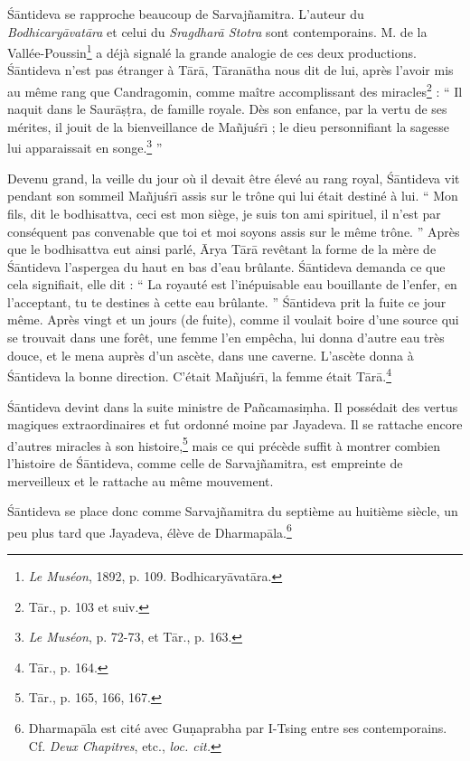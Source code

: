 \documentclass[a4paper, 11pt, oneside, french]{article}
\begin{document}
\'{S}\={a}ntideva se rapproche beaucoup de Sarvaj\~{n}amitra. L'auteur du \emph{Bodhicary\={a}vat\={a}ra} et celui du \emph{Sragdhar\={a} Stotra} sont contemporains. M. de la Vallée-Poussin\footnote{\emph{Le Muséon}, 1892, p. 109. Bodhicary\={a}vat\={a}ra.} a déjà signalé la grande analogie de ces deux productions. \'{S}\={a}ntideva n'est pas étranger à T\={a}r\={a}, T\={a}ran\={a}tha nous dit de lui, après l'avoir mis au même rang que Candragomin, comme maître accomplissant des miracles\footnote{T\={a}r., p. 103 et suiv.} : `` Il naquit dans le Saur\={a}\d{s}\d{t}ra, de famille royale. Dès son enfance, par la vertu de ses mérites, il jouit de la bienveillance de Ma\~{n}ju\'{s}r\={\i} ; le dieu personnifiant la sagesse lui apparaissait en songe.\footnote{\emph{Le Muséon}, p. 72-73, et T\={a}r., p. 163.} ''

Devenu grand, la veille du jour où il devait être élevé au rang royal, \'{S}\={a}ntideva vit pendant son sommeil Ma\~{n}ju\'{s}r\={\i} assis sur le trône qui lui était destiné à lui. `` Mon fils, dit le bodhisattva, ceci est mon siège, je suis ton ami spirituel, il n'est par conséquent pas convenable que toi et moi soyons assis sur le même trône. '' Après que le bodhisattva eut ainsi parlé, \={A}rya T\={a}r\={a} revêtant la forme de la mère de \'{S}\={a}ntideva l'aspergea du haut en bas d'eau brûlante. \'{S}\={a}ntideva demanda ce que cela signifiait, elle dit : `` La royauté est l'inépuisable eau bouillante de l'enfer, en l'acceptant, tu te destines à cette eau brûlante. '' \'{S}\={a}ntideva prit la fuite ce jour même. Après vingt et un jours (de fuite), comme il voulait boire d'une source qui se trouvait dans une forêt, une femme l'en empêcha, lui donna d'autre eau très douce, et le mena auprès d'un ascète, dans une caverne. L'ascète donna à \'{S}\={a}ntideva la bonne direction. C'était Ma\~{n}ju\'{s}r\={\i}, la femme était T\={a}r\={a}.\footnote{T\={a}r., p. 164.}

\'{S}\={a}ntideva devint dans la suite ministre de Pa\~{n}camasi\d{m}ha. Il possédait des vertus magiques extraordinaires et fut ordonné moine par Jayadeva. Il se rattache encore d'autres miracles à son histoire,\footnote{T\={a}r., p. 165, 166, 167.} mais ce qui précède suffit à montrer combien l'histoire de \'{S}\={a}ntideva, comme celle de Sarvaj\~{n}amitra, est empreinte de merveilleux et le rattache au même mouvement.

\'{S}\={a}ntideva se place donc comme Sarvaj\~{n}amitra du septième au huitième siècle, un peu plus tard que Jayadeva, élève de Dharmap\={a}la.\footnote{Dharmap\={a}la est cité avec Gu\d{n}aprabha par I-Tsing entre ses contemporains. Cf. \emph{Deux Chapitres}, etc., \emph{loc. cit.}}
\end{document}
